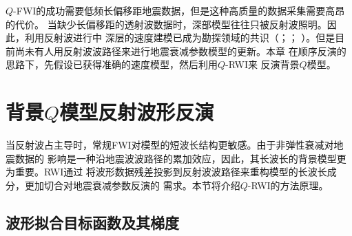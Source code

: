 $Q$-FWI的成功需要低频长偏移距地震数据，但是这种高质量的数据采集需要高昂的代价。
当缺少长偏移距的透射波数据时，深部模型往往只被反射波照明。因此，利用反射波进行中
深层的速度建模已成为勘探领域的共识（；；
）。但是目前尚未有人用反射波波路径来进行地震衰减参数模型的更新。本章
在顺序反演的思路下，先假设已获得准确的速度模型，然后利用$Q$-RWI来
反演背景$Q$模型。

\vspace{0.7cm}
\section{背景$Q$模型反射波形反演}
\vspace{0.8cm}

当反射波占主导时，常规FWI对模型的短波长结构更敏感。由于非弹性衰减对地震数据的
影响是一种沿地震波波路径的累加效应，因此，其长波长的背景模型更为重要。RWI通过
将波形数据残差投影到反射波波路径来重构模型的长波长成分，更加切合对地震衰减参数反演的
需求。本节将介绍$Q$-RWI的方法原理。

\subsection{波形拟合目标函数及其梯度}
\vspace{0.8cm}

